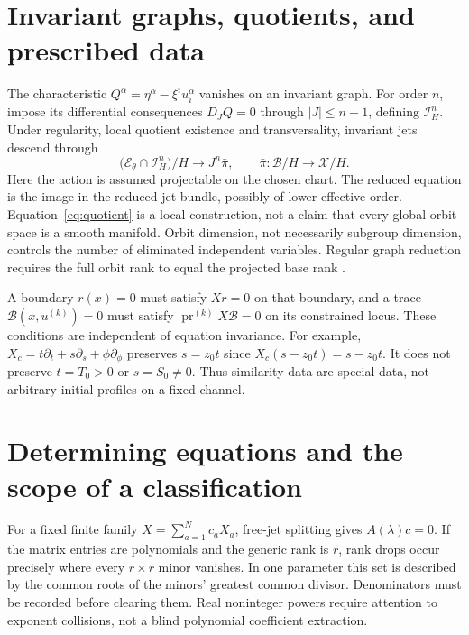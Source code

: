 \documentclass[11pt,a4paper,oneside]{report}
\numberwithin{equation}{chapter}
\newcommand{\E}{\mathcal E}
\newcommand{\pr}{\operatorname{pr}}
\begin{document}
\section{Invariant graphs, quotients, and prescribed data}
The characteristic $Q^\alpha=\eta^\alpha-\xi^iu_i^\alpha$ vanishes on an invariant graph. For order $n$, impose its differential consequences $D_JQ=0$ through $|J|\le n-1$, defining $\mathcal I_H^n$. Under regularity, local quotient existence and transversality, invariant jets descend through
\begin{equation}\label{eq:quotient}
\bigl(\E_\theta\cap\mathcal I_H^n\bigr)/H
\longrightarrow J^n\bar\pi,\qquad
\bar\pi:\mathcal B/H\longrightarrow\mathcal X/H.
\end{equation}
Here the action is assumed projectable on the chosen chart. The reduced equation is the image in the reduced jet bundle, possibly of lower effective order. Equation~\eqref{eq:quotient} is a local construction, not a claim that every global orbit space is a smooth manifold. Orbit dimension, not necessarily subgroup dimension, controls the number of eliminated independent variables. Regular graph reduction requires the full orbit rank to equal the projected base rank \cite{olver1986,anderson2000}.



A boundary $r(x)=0$ must satisfy $Xr=0$ on that boundary, and a trace $\mathcal B(x,u^{(k)})=0$ must satisfy $\pr^{(k)}X\mathcal B=0$ on its constrained locus. These conditions are independent of equation invariance. For example, $X_c=t\partial_t+s\partial_s+\phi\partial_\phi$ preserves $s=z_0t$ since $X_c(s-z_0t)=s-z_0t$. It does not preserve $t=T_0>0$ or $s=S_0\ne0$. Thus similarity data are special data, not arbitrary initial profiles on a fixed channel.



\section{Determining equations and the scope of a classification}
For a fixed finite family $X=\sum_{a=1}^Nc_aX_a$, free-jet splitting gives $A(\lambda)c=0$. If the matrix entries are polynomials and the generic rank is $r$, rank drops occur precisely where every $r\times r$ minor vanishes. In one parameter this set is described by the common roots of the minors' greatest common divisor. Denominators must be recorded before clearing them. Real noninteger powers require attention to exponent collisions, not a blind polynomial coefficient extraction.
\end{document}
